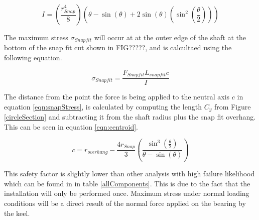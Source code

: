 \documentclass[../main.tex]{subfiles}
\begin{document}
\begin{equation}
\label{eqn:Isnap}
I = \left(\frac{r_{Snap}^4}{8}\right)  \left(\theta -\sin(\theta)+2\sin(\theta)(\sin^2\left(\frac{\theta}{2}\right))\right)
\end{equation}

The maximum stress $\sigma_{Snapfit}$ will occur at at the outer edge of the shaft at the bottom of the snap fit cut shown in FIG?????, and is calcultaed using the following equation.

\begin{equation}
\label{eqn:snapStress}
\sigma_{Snapfit} = \frac{F_{Snapfit} L_{snapfit} c}{I}
\end{equation}

The distance from the point the force is being applied to the neutral axis $c$ in equation \ref{eqn:snapStress}, is calculated by computing the length $C_y$ from Figure \ref{circleSection} and subtracting it from the shaft radius plus the snap fit overhang. This can be seen in equation \ref{eqn:centroid}. 

 \begin{equation}
 \label{eqn:centroid}
 c = r_{overhang} - \frac{4r_{Snap}}{3}\left(\frac{\sin^3\left(\frac{\theta}{2}\right)} {\theta-\sin(\theta)}\right)
 \end{equation}

 This safety factor is slightly lower than other analysis with high failure likelihood which can be found in in table \ref{allComponents}. This is due to the fact that the installation will only be performed once. Maximum stress under normal loading conditions will be a direct result of the normal force applied on the bearing by the keel.
\end{document}

